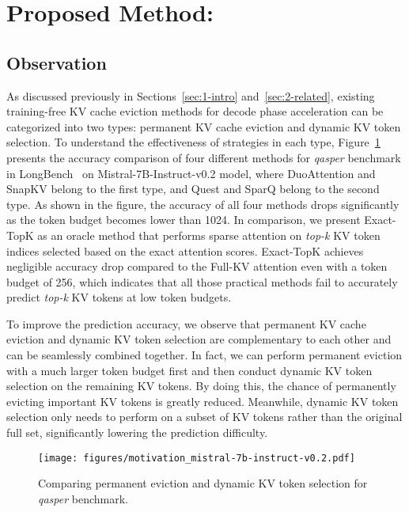 \section{Proposed Method: \rocketkv}
\label{sec:3-proposed}


\subsection{Observation} 

As discussed previously in Sections~\ref{sec:1-intro} and~\ref{sec:2-related}, existing training-free KV cache eviction methods for decode phase acceleration can be categorized into two types: permanent KV cache eviction and dynamic KV token selection. To understand the effectiveness of strategies in each type, Figure~\ref{fig:observation} presents the accuracy comparison of four different methods for \textit{qasper} benchmark in LongBench~\cite{longbench2023} on Mistral-7B-Instruct-v0.2 model, where DuoAttention and SnapKV belong to the first type, and Quest and SparQ belong to the second type. As shown in the figure, the accuracy of all four methods drops significantly as the token budget becomes lower than 1024. In comparison, we present Exact-TopK as an oracle method that performs sparse attention on \textit{top-k} KV token indices selected based on the exact attention scores. Exact-TopK achieves negligible accuracy drop compared to the Full-KV attention even with a token budget of 256, which indicates that all those practical methods fail to accurately predict \textit{top-k} KV tokens at low token budgets.

To improve the prediction accuracy, we observe that permanent KV cache eviction and dynamic KV token selection are complementary to each other and can be seamlessly combined together. In fact, we can perform permanent \kv eviction with a much larger token budget first and then conduct dynamic KV token selection on the remaining KV tokens. By doing this, the chance of permanently evicting important KV tokens is greatly reduced. Meanwhile, dynamic KV token selection only needs to perform on a subset of KV tokens rather than the original full set, significantly lowering the prediction difficulty.


\begin{figure}[t]
  \centering
  \texttt{[image: figures/motivation\_mistral-7b-instruct-v0.2.pdf]}
  \caption{Comparing permanent \kv eviction and dynamic KV token selection for \textit{qasper} benchmark.}
  \label{fig:observation}
\end{figure}



